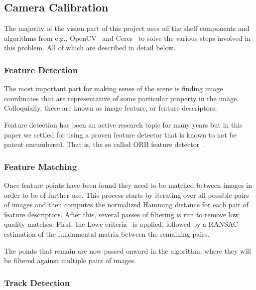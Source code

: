 \documentclass[preprint,acmtog]{acmart}
\begin{document}
\subsection{Camera Calibration}

The majority of the vision part of this project uses off the shelf components
and algorithms from e.g., OpenCV~\cite{opencv_library} and
Ceres~\cite{ceres-solver} to solve the various steps involved in this
problem. All of which are described in detail below.

\subsubsection{Feature Detection}

The most important part for making sense of the scene is finding image
coordinates that are representative of some particular property in the
image. Colloquially, these are known as image feature, or feature descriptors.

Feature detection has been an active research topic for many years but in this
paper we settled for using a proven feature detector that is known to not be
patent encumbered. That is, the so called ORB feature detector~\cite{orb2011}.


\subsubsection{Feature Matching}

Once feature points have been found they need to be matched between images in
order to be of further use. This process starts by iterating over all possible
pairs of images and then computes the normalized Hamming distance for each pair
of feature descriptors. After this, several passes of filtering is run to remove
low quality matches. First, the Lowe criteria~\cite{sift2004} is applied,
followed by a RANSAC~\cite{ransac} estimation of the fundamental matrix between
the remaining pairs.



The points that remain are now passed onward in the algorithm, where they will
be filtered against multiple pairs of images.


\subsubsection{Track Detection}
\end{document}
